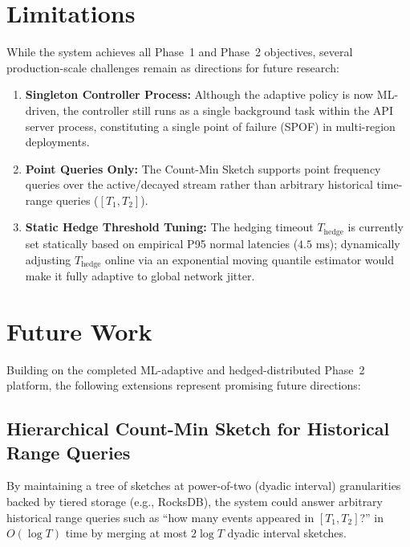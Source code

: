 \section{Limitations}

While the system achieves all Phase~1 and Phase~2 objectives, several production-scale challenges remain as directions for future research:

\begin{enumerate}
    \item \textbf{Singleton Controller Process:} Although the adaptive policy is now ML-driven, the controller still runs as a single background task within the API server process, constituting a single point of failure (SPOF) in multi-region deployments.

    \item \textbf{Point Queries Only:} The Count-Min Sketch supports point frequency queries over the active/decayed stream rather than arbitrary historical time-range queries ($[T_1, T_2]$).

    \item \textbf{Static Hedge Threshold Tuning:} The hedging timeout $T_{\text{hedge}}$ is currently set statically based on empirical P95 normal latencies ($4.5\text{ ms}$); dynamically adjusting $T_{\text{hedge}}$ online via an exponential moving quantile estimator would make it fully adaptive to global network jitter.
\end{enumerate}


\section{Future Work}
\label{sec:future_work}

Building on the completed ML-adaptive and hedged-distributed Phase~2 platform, the following extensions represent promising future directions:

\subsection{Hierarchical Count-Min Sketch for Historical Range Queries}

By maintaining a tree of sketches at power-of-two (dyadic interval) granularities backed by tiered storage (e.g., RocksDB), the system could answer arbitrary historical range queries such as ``how many events appeared in $[T_1, T_2]$?'' in $O(\log T)$ time by merging at most $2\log T$ dyadic interval sketches.

